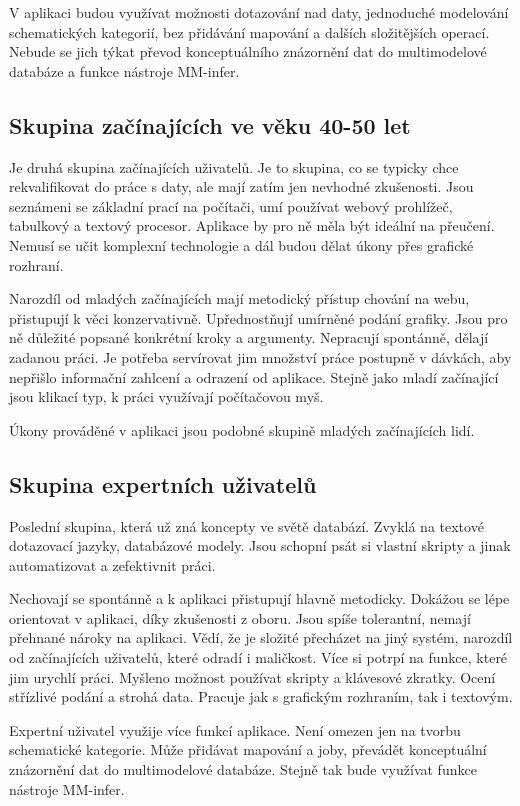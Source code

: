 V aplikaci budou využívat možnosti dotazování nad daty, jednoduché modelování schematických kategorií, bez přidávání mapování a dalších složitějších operací. Nebude se jich týkat převod konceptuálního znázornění dat do multimodelové databáze a funkce nástroje MM-infer.

\subsection{Skupina začínajících ve věku 40-50 let}

Je druhá skupina začínajících uživatelů. Je to skupina, co se typicky chce rekvalifikovat do práce s daty, ale mají zatím jen nevhodné zkušenosti. Jsou seznámeni se základní prací na počítači, umí používat webový prohlížeč, tabulkový a textový procesor. Aplikace by pro ně měla být ideální na přeučení. Nemusí se učit komplexní technologie a dál budou dělat úkony přes grafické rozhraní.

Narozdíl od mladých začínajících mají metodický přístup chování na webu, přistupují k věci konzervativně. Upřednostňují umírněné podání grafiky. Jsou pro ně důležité popsané konkrétní kroky a argumenty. Nepracují spontánně, dělají zadanou práci. Je potřeba servírovat jim množství práce postupně v dávkách, aby nepřišlo informační zahlcení a odrazení od aplikace. Stejně jako mladí začínající jsou klikací typ, k práci využívají počítačovou myš. 

Úkony prováděné v aplikaci jsou podobné skupině mladých začínajících lidí.

\subsection{Skupina expertních uživatelů}

Poslední skupina, která už zná koncepty ve světě databází. Zvyklá na textové dotazovací jazyky, databázové modely. Jsou schopní psát si vlastní skripty a jinak automatizovat a zefektivnit práci.

Nechovají se spontánně a k aplikaci přistupují hlavně metodicky. Dokážou se lépe orientovat v aplikaci, díky zkušenosti z oboru. Jsou spíše tolerantní, nemají přehnané nároky na aplikaci. Vědí, že je složité přecházet na jiný systém, narozdíl od začínajících uživatelů, které odradí i maličkost. Více si potrpí na funkce, které jim urychlí práci. Myšleno možnost používat skripty a klávesové zkratky. Ocení střízlivé podání a strohá data. Pracuje jak s grafickým rozhraním, tak i textovým.

Expertní uživatel využije více funkcí aplikace. Není omezen jen na tvorbu schematické kategorie. Může přidávat mapování a joby, převádět konceptuální znázornění dat do multimodelové databáze. Stejně tak bude využívat funkce nástroje MM-infer.
